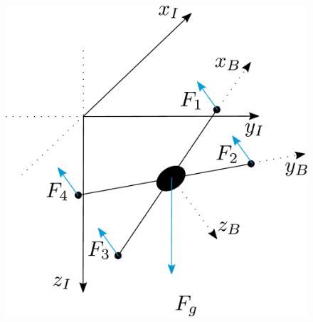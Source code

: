 \begin{minipage}{\linewidth}
	\begin{minipage}{0.6\linewidth}
		\begin{figure}[H]
			\includegraphics[scale=.4]{figures/droneDiagram}
			\centering
			

\end{figure}
\end{minipage}
\end{minipage}

